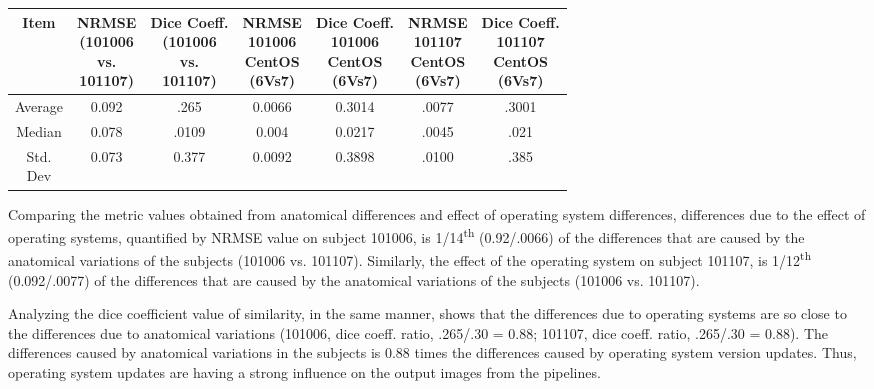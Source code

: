 \begin{center}
\begin{tabularx}{.98\textwidth}{|c|c|c|c|c|c|c|}
\hline
Item  & \makecell[l]{NRMSE\\(101006 \\ vs.\\101107)} & \makecell[l]{Dice Coeff.\\(101006\\ vs.\\101107)} & \makecell[l]{NRMSE\\101006\\CentOS\\(6Vs7)} & \makecell[l]{Dice Coeff.\\ 101006\\CentOS\\(6Vs7)} & \makecell[l]{NRMSE\\101107\\CentOS\\(6Vs7)} & \makecell[l]{Dice Coeff.\\ 101107\\CentOS\\(6Vs7)} \\ \hline
Average            & 0.092        & .265      & 0.0066     & 0.3014   & .0077   & .3001     \\ \hline
Median             & 0.078    & .0109       & 0.004          & 0.0217           & .0045     & .021  \\ \hline
\makecell[l]{Std.\\Dev} & 0.073     & 0.377           & 0.0092         & 0.3898   & .0100       & .385 \\ \hline
\end{tabularx}
\label{tab:comparison_table}
\end{center}

Comparing the metric values obtained from anatomical differences and effect of operating system differences, differences due to the effect of operating systems, quantified by NRMSE value on subject 101006, is 1/14\textsuperscript{th} (0.92/.0066) of the differences that are caused by the anatomical variations of the subjects (101006 vs. 101107). Similarly, the effect of the operating system on subject 101107, is 1/12\textsuperscript{th} (0.092/.0077) of the differences that are caused by the anatomical variations of the subjects (101006 vs. 101107).

Analyzing the dice coefficient value of similarity, in the same manner,  shows that the differences due to operating systems are so close to the differences due to anatomical variations (101006, dice coeff. ratio, .265/.30 = 0.88; 101107, dice coeff. ratio, .265/.30 = 0.88). The differences caused by anatomical variations in the subjects is 0.88 times the differences caused by operating system version updates. Thus, operating system updates are having a strong influence on the output images from the pipelines.
